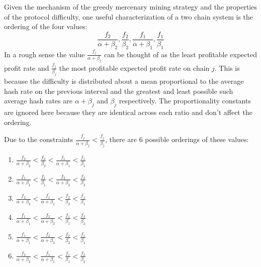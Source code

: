 \documentclass[10pt, preprint]{aastex}
\begin{document}
Given the mechanism of the greedy mercenary mining strategy and the properties of the protocol difficulty, one useful characterization of a two chain system is the ordering of the four values: 
$$
\frac{f_2}{\alpha + \beta_2}, \frac{f_2}{\beta_2}, \frac{f_1}{\alpha + \beta_1}, \frac{f_1}{\beta_1}
$$
In a rough sense the value $\frac{f_j}{\alpha + \beta_j}$ can be thought of as the least profitable expected profit rate and $\frac{f_j}{\beta_j}$ the most profitable expected profit rate on chain $j$.  This is because the difficulty is distributed about a mean proportional to the average hash rate on the previous interval and the greatest and least possible such average hash rates are $\alpha + \beta_j$ and $\beta_j$ respectively.  The proportionality constants are ignored here because they are identical across each ratio and don't affect the ordering.  

Due to the constraints $\frac{f_j}{\alpha + \beta_j} < \frac{f_j}{\beta_j}$, there are 6 possible orderings of these values: 
\begin{enumerate}
\item
$\frac{f_2}{\alpha + \beta_2} < \frac{f_2}{\beta_2} < \frac{f_1}{\alpha + \beta_1} < \frac{f_1}{\beta_1}$
\item
$\frac{f_1}{\alpha + \beta_1} < \frac{f_1}{\beta_1} < \frac{f_2}{\alpha + \beta_2} < \frac{f_2}{\beta_2} $
\item
$\frac{f_2}{\alpha + \beta_2} < \frac{f_1}{\alpha + \beta_1} < \frac{f_2}{\beta_2} < \frac{f_1}{\beta_1}$
\item
$\frac{f_1}{\alpha + \beta_1} < \frac{f_2}{\alpha + \beta_2} < \frac{f_1}{\beta_1} < \frac{f_2}{\beta_2}$
\item
$\frac{f_1}{\alpha + \beta_1} <  \frac{f_2}{\alpha + \beta_2} < \frac{f_2}{\beta_2} <  \frac{f_1}{\beta_1} $
\item
$ \frac{f_2}{\alpha + \beta_2} <  \frac{f_1}{\alpha + \beta_1} < \frac{f_1}{\beta_1}  < \frac{f_2}{\beta_2} $
\end{enumerate}
\end{document}

